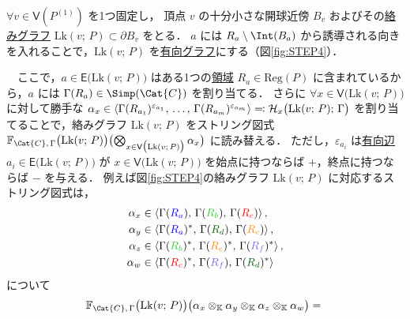 \documentclass[TQFT_main]{subfiles}
\begin{document}
\begin{description}
    $\forall v \in \mathsf{V}(P^{(1)})$ を1つ固定し，
    頂点 $v$ の十分小さな開球近傍 $B_v$ およびその\hyperref[def:linkedG]{絡みグラフ} $\mathrm{Lk}(v;\, P) \subset \partial B_v$ をとる．
    $a$ には $R_a \setminus \Int(B_a)$ から誘導される向きを入れることで，$\mathrm{Lk}(v;\, P)$ を\underline{有向グラフ}にする（図\ref{fig:STEP4}）．
    
    　ここで，$a \in \mathsf{E}\bigl(\mathrm{Lk}(v;\, P)\bigr)$ はある1つの\hyperref[def:polyhedron]{領域} $R_a \in \mathrm{Reg}(P)$ に含まれているから，$a$ には $\Gamma(R_a) \in \Simp(\Cat{C})$ を割り当てる．
    さらに $\forall x \in \mathsf{V}\bigl(\mathrm{Lk}(v;\, P)\bigr)$ に対して勝手な $\alpha_x \in \expval{\Gamma(R_{a_1})^{\varepsilon_{a_1}},\, \dots,\, \Gamma(R_{a_m})^{\varepsilon_{a_m}}} \eqqcolon \mathcal{H}_x\bigl(\mathrm{Lk}(v;\, P);\, \Gamma\bigr)$ を割り当てることで，絡みグラフ $\mathrm{Lk}(v;\, P)$ をストリング図式 $\mathbb{F}_{\Cat{C},\, \Gamma} \bigl( \mathrm{Lk}(v;\, P) \bigr)\bigl( \bigotimes_{x \in \mathsf{V} \bigl( \mathrm{Lk}(v;\, P) \bigr) } \alpha_x \bigr)$ に読み替える．
    ただし，$\varepsilon_{a_i}$ は\underline{有向辺} $a_i \in \mathsf{E} \bigl( \mathrm{Lk}(v;\, P) \bigr)$ が $x \in \mathsf{V}\bigl(\mathrm{Lk}(v;\, P)\bigr)$ を始点に持つならば $+$，終点に持つならば $-$ を与える．
    例えば図\ref{fig:STEP4}の絡みグラフ $\mathrm{Lk}(v;\, P)$ に対応するストリング図式は，
    \begin{align}
        \alpha_x &\in \expval{\Gamma(\textcolor{blue}{R_a}),\, \Gamma(\textcolor{LimeGreen}{R_b}),\, \Gamma(\textcolor{red}{R_c})}, \\
        \alpha_y &\in \expval{\Gamma(\textcolor{blue}{R_a})^*,\, \Gamma(\textcolor{DarkGreen}{R_d}),\, \Gamma(\textcolor{DarkOrange}{R_e})}, \\
        \alpha_z &\in \expval{\Gamma(\textcolor{LimeGreen}{R_b})^*,\, \Gamma(\textcolor{DarkOrange}{R_e})^*,\,\Gamma(\textcolor{MediumSlateBlue}{R_f})^*}, \\
        \alpha_w &\in \expval{\Gamma(\textcolor{red}{R_c})^*,\, \Gamma(\textcolor{MediumSlateBlue}{R_f}),\, \Gamma(\textcolor{DarkGreen}{R_d})^*}
    \end{align}
    について
    \begin{align}
        \mathbb{F}_{\Cat{C},\, \Gamma} \bigl( \mathrm{Lk}(v;\, P) \bigr) \bigl(\alpha_x \otimes_{\mathbb{K}} \alpha_y \otimes_{\mathbb{K}} \alpha_z \otimes_{\mathbb{K}} \alpha_w\bigr)
        = \begin{tikzpicture}[baseline={([yshift=-.5ex]current bounding box.center)}]

\end{tikzpicture}
\end{align}
\end{description}
\end{document}
